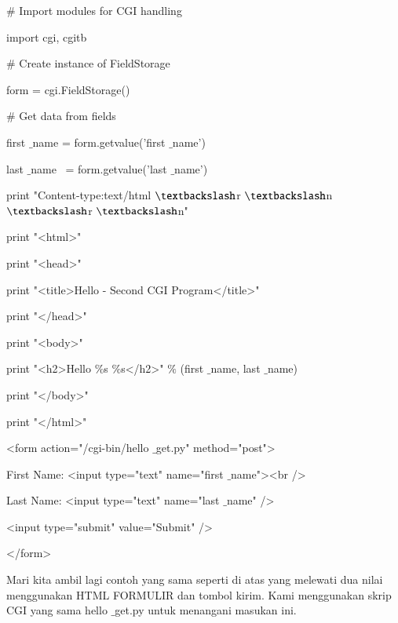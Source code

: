 \documentclass[a4paper,12pt]{report}
\begin{document}
\noindent 
 $  \#  $ Import modules for CGI handling  \par
\noindent 
import cgi, cgitb  \par
\vspace{12pt}
\noindent 
 $  \#  $ Create instance of FieldStorage  \par
\noindent 
form = cgi.FieldStorage()  \par
\vspace{12pt}
\noindent 
 $  \#  $ Get data from fields \par
\noindent 
first $  \_  $name = form.getvalue('first $  \_  $name') \par
\noindent 
last $  \_  $name~ = form.getvalue('last $  \_  $name') \par
\vspace{12pt}
\noindent 
print "Content-type:text/html $  \textbackslash  $r $  \textbackslash  $n $  \textbackslash  $r $  \textbackslash  $n" \par
\noindent 
print "<html>" \par
\noindent 
print "<head>" \par
\noindent 
print "<title>Hello - Second CGI Program</title>" \par
\noindent 
print "</head>" \par
\noindent 
print "<body>" \par
\noindent 
print "<h2>Hello  $  \%  $s  $  \%  $s</h2>"  $  \%  $ (first $  \_  $name, last $  \_  $name) \par
\noindent 
print "</body>" \par
\noindent 
print "</html>" \par
\vspace{12pt}
\noindent 
<form action="/cgi-bin/hello $  \_  $get.py" method="post"> \par
\noindent 
First Name: <input type="text" name="first $  \_  $name"><br /> \par
\noindent 
Last Name: <input type="text" name="last $  \_  $name" /> \par
\vspace{12pt}
\noindent 
<input type="submit" value="Submit" /> \par
\noindent 
</form> \par
\vspace{16pt}
\noindent 
Mari kita ambil lagi contoh yang sama seperti di atas yang melewati dua nilai menggunakan HTML FORMULIR dan tombol kirim. Kami menggunakan skrip CGI yang sama hello $  \_  $get.py untuk menangani masukan ini. \par
\end{document}
